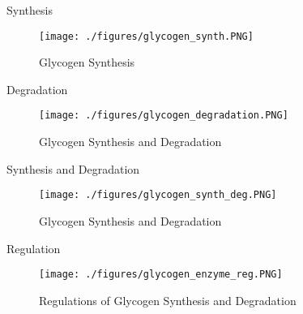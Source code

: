 \documentclass[presentation, smaller]{beamer}
\begin{document}
\begin{frame}[label={sec:orgfb10a72}]{Synthesis}
\begin{figure}[htbp]
\centering
\texttt{[image: ./figures/glycogen\_synth.PNG]}
\caption{\label{fig:org2198a09}
Glycogen Synthesis}
\end{figure}
\end{frame}

\begin{frame}[label={sec:org135d9d1}]{Degradation}
\begin{figure}[htbp]
\centering
\texttt{[image: ./figures/glycogen\_degradation.PNG]}
\caption{\label{fig:org0c90329}
Glycogen Synthesis and Degradation}
\end{figure}
\end{frame}

\begin{frame}[label={sec:orgedf829b}]{Synthesis and Degradation}
\begin{figure}[htbp]
\centering
\texttt{[image: ./figures/glycogen\_synth\_deg.PNG]}
\caption{\label{fig:org6803cf2}
Glycogen Synthesis and Degradation}
\end{figure}
\end{frame}

\begin{frame}[label={sec:org7596d61}]{Regulation}
\begin{figure}[htbp]
\centering
\texttt{[image: ./figures/glycogen\_enzyme\_reg.PNG]}
\caption{\label{fig:orgd0ce86a}
Regulations of Glycogen Synthesis and Degradation}
\end{figure}
\end{frame}
\end{document}
